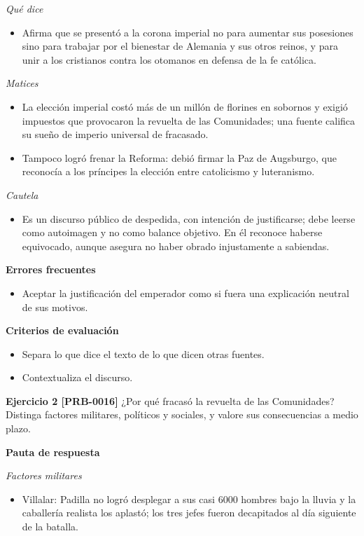 \documentclass{book}
\begin{document}
\noindent\textit{Qué dice}
\begin{itemize}
\item Afirma que se presentó a la corona imperial no para aumentar sus posesiones sino para trabajar por el bienestar de Alemania y sus otros reinos, y para unir a los cristianos contra los otomanos en defensa de la fe católica.
\end{itemize}

\noindent\textit{Matices}
\begin{itemize}
\item La elección imperial costó más de un millón de florines en sobornos y exigió impuestos que provocaron la revuelta de las Comunidades; una fuente califica su sueño de imperio universal de fracasado.
\item Tampoco logró frenar la Reforma: debió firmar la Paz de Augsburgo, que reconocía a los príncipes la elección entre catolicismo y luteranismo.
\end{itemize}

\noindent\textit{Cautela}
\begin{itemize}
\item Es un discurso público de despedida, con intención de justificarse; debe leerse como autoimagen y no como balance objetivo. En él reconoce haberse equivocado, aunque asegura no haber obrado injustamente a sabiendas.
\end{itemize}

\noindent\textbf{Errores frecuentes}
\begin{itemize}
\item Aceptar la justificación del emperador como si fuera una explicación neutral de sus motivos.
\end{itemize}

\noindent\textbf{Criterios de evaluación}
\begin{itemize}
\item Separa lo que dice el texto de lo que dicen otras fuentes.
\item Contextualiza el discurso.
\end{itemize}

\noindent\textbf{Ejercicio 2 [PRB-0016]}
¿Por qué fracasó la revuelta de las Comunidades? Distinga factores militares, políticos y sociales, y valore sus consecuencias a medio plazo.


\noindent\textbf{Pauta de respuesta}

\noindent\textit{Factores militares}
\begin{itemize}
\item Villalar: Padilla no logró desplegar a sus casi 6000 hombres bajo la lluvia y la caballería realista los aplastó; los tres jefes fueron decapitados al día siguiente de la batalla.
\end{itemize}
\end{document}
